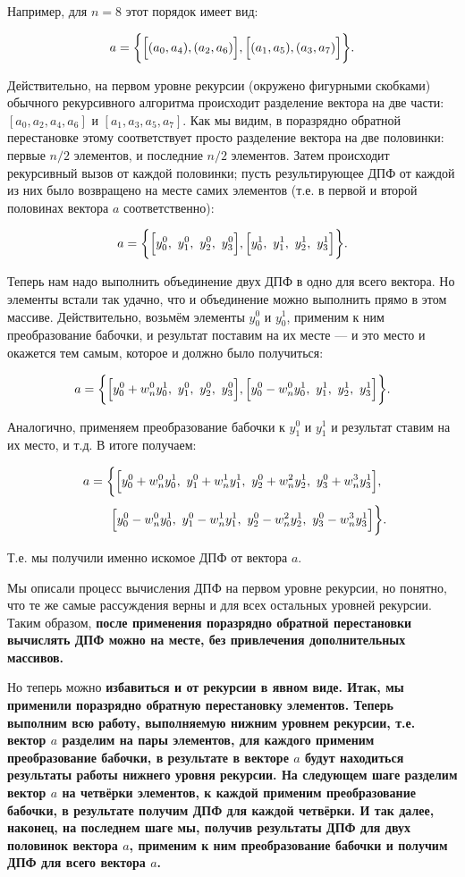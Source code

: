 Например, для $n=8$ этот порядок имеет вид:

$$ a = \biggl\{ \Bigl[ (a_0,a_4), (a_2, a_6) \Bigr] , \Bigl[ (a_1, a_5), (a_3, a_7) \Bigr] \biggr\}. $$

Действительно, на первом уровне рекурсии (окружено фигурными скобками) обычного рекурсивного алгоритма происходит разделение вектора на две части: $[a_0,a_2,a_4,a_6]$ и $[a_1,a_3,a_5,a_7]$. Как мы видим, в поразрядно обратной перестановке этому соответствует просто разделение вектора на две половинки: первые $n/2$ элементов, и последние $n/2$ элементов. Затем происходит рекурсивный вызов от каждой половинки; пусть результирующее ДПФ от каждой из них было возвращено на месте самих элементов (т.е. в первой и второй половинах вектора $a$ соответственно):

$$ a = \biggl\{ \Bigl[ y_0^0,\ y_1^0,\ y_2^0,\ y_3^0 \Bigr], \Bigl[ y_0^1,\ y_1^1,\ y_2^1,\ y_3^1 \Bigr] \biggr\}. $$

Теперь нам надо выполнить объединение двух ДПФ в одно для всего вектора. Но элементы встали так удачно, что и объединение можно выполнить прямо в этом массиве. Действительно, возьмём элементы $y_0^0$ и $y_0^1$, применим к ним преобразование бабочки, и результат поставим на их месте --- и это место и окажется тем самым, которое и должно было получиться:

$$ a = \biggl\{ \Bigl[ y_0^0+w_n^0y_0^1,\ y_1^0,\ y_2^0,\ y_3^0 \Bigr], \Bigl[ y_0^0-w_n^0y_0^1,\ y_1^1,\ y_2^1,\ y_3^1 \Bigr] \biggr\}. $$

Аналогично, применяем преобразование бабочки к $y_1^0$ и $y_1^1$ и результат ставим на их место, и т.д. В итоге получаем:

$$ a = \biggl\{ \Bigl[ y_0^0+w_n^0y_0^1,\ y_1^0+w_n^1y_1^1,\ y_2^0+w_n^2y_2^1,\ y_3^0+w_n^3y_3^1 \Bigr], $$
$$ ~~~~~~~~ \Bigl[ y_0^0-w_n^0y_0^1,\ y_1^0-w_n^1y_1^1,\ y_2^0-w_n^2y_2^1,\ y_3^0-w_n^3y_3^1 \Bigr] \biggr\}. $$

Т.е. мы получили именно искомое ДПФ от вектора $a$.

Мы описали процесс вычисления ДПФ на первом уровне рекурсии, но понятно, что те же самые рассуждения верны и для всех остальных уровней рекурсии. Таким образом, \bf{после применения поразрядно обратной перестановки вычислять ДПФ можно на месте}, без привлечения дополнительных массивов.

Но теперь можно \bf{избавиться и от рекурсии} в явном виде. Итак, мы применили поразрядно обратную перестановку элементов. Теперь выполним всю работу, выполняемую нижним уровнем рекурсии, т.е. вектор $a$ разделим на пары элементов, для каждого применим преобразование бабочки, в результате в векторе $a$ будут находиться результаты работы нижнего уровня рекурсии. На следующем шаге разделим вектор $a$ на четвёрки элементов, к каждой применим преобразование бабочки, в результате получим ДПФ для каждой четвёрки. И так далее, наконец, на последнем шаге мы, получив результаты ДПФ для двух половинок вектора $a$, применим к ним преобразование бабочки и получим ДПФ для всего вектора $a$.

